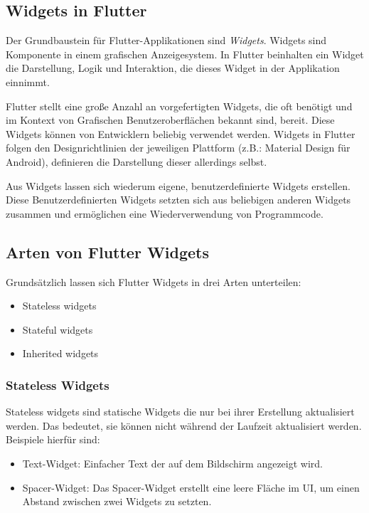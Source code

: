 \subsection{Widgets in Flutter}
Der Grundbaustein für Flutter-Applikationen sind \textit{Widgets}.
Widgets sind Komponente in einem grafischen Anzeigesystem. 
In Flutter beinhalten ein Widget die Darstellung, Logik und Interaktion, die dieses Widget in der Applikation einnimmt.


Flutter stellt eine große Anzahl an vorgefertigten Widgets, die oft benötigt und im Kontext von Grafischen
Benutzeroberflächen bekannt sind, bereit. Diese Widgets können von Entwicklern beliebig verwendet werden.
Widgets in Flutter folgen den Designrichtlinien der jeweiligen Plattform (z.B.: Material Design für Android), 
definieren die Darstellung dieser allerdings selbst.

Aus Widgets lassen sich wiederum eigene, benutzerdefinierte Widgets erstellen.
Diese Benutzerdefinierten Widgets setzten sich aus beliebigen anderen Widgets zusammen 
und ermöglichen eine Wiederverwendung von Programmcode. \cite{flutterwikipediaDE}

\subsection{Arten von Flutter Widgets}
Grundsätzlich lassen sich Flutter Widgets in drei Arten unterteilen:
 \begin{itemize}
    \item Stateless widgets
    \item Stateful widgets
    \item Inherited widgets
 \end{itemize}

\subsubsection{Stateless Widgets}
Stateless widgets sind statische Widgets die nur bei ihrer Erstellung aktualisiert werden.
Das bedeutet, sie können nicht während der Laufzeit aktualisiert werden. \cite{flutterstatelesswidgets}
Beispiele hierfür sind:
\begin{itemize}
    \item Text-Widget: Einfacher Text der auf dem Bildschirm angezeigt wird.
    \item Spacer-Widget: Das Spacer-Widget erstellt eine leere Fläche im UI,
    um einen Abstand zwischen zwei Widgets zu setzten.
\end{itemize}


